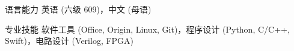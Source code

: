 

\begin{cvskills}

  \cvskill
  {语言能力} %
  {英语 (六级 609)，中文 (母语)} %

  \cvskill
  {专业技能} %
  {软件工具 (Office, Origin, Linux, Git)，程序设计 (Python, C/C++, Swift)，电路设计 (Verilog, FPGA)} %

\end{cvskills}
